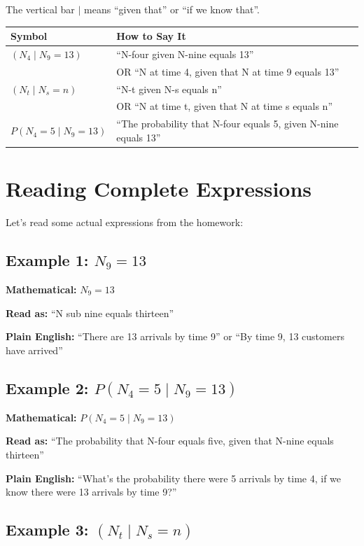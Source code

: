 \documentclass[11pt]{article}
\begin{document}
The vertical bar $|$ means ``given that'' or ``if we know that''.

\begin{table}[h]
\centering
\begin{tabular}{|l|l|}
\hline
\textbf{Symbol} & \textbf{How to Say It} \\
\hline
$(N_4 \mid N_9 = 13)$ & ``N-four given N-nine equals 13'' \\
 & OR ``N at time 4, given that N at time 9 equals 13'' \\
\hline
$(N_t \mid N_s = n)$ & ``N-t given N-s equals n'' \\
 & OR ``N at time t, given that N at time s equals n'' \\
\hline
$P(N_4 = 5 \mid N_9 = 13)$ & ``The probability that N-four equals 5, given N-nine equals 13'' \\
\hline
\end{tabular}
\end{table}

\section{Reading Complete Expressions}

Let's read some actual expressions from the homework:

\subsection{Example 1: $N_9 = 13$}

\textbf{Mathematical:} $N_9 = 13$

\textbf{Read as:} ``N sub nine equals thirteen''

\textbf{Plain English:} ``There are 13 arrivals by time 9'' or ``By time 9, 13 customers have arrived''

\subsection{Example 2: $P(N_4 = 5 \mid N_9 = 13)$}

\textbf{Mathematical:} $P(N_4 = 5 \mid N_9 = 13)$

\textbf{Read as:} ``The probability that N-four equals five, given that N-nine equals thirteen''

\textbf{Plain English:} ``What's the probability there were 5 arrivals by time 4, if we know there were 13 arrivals by time 9?''

\subsection{Example 3: $(N_t \mid N_s = n)$}
\end{document}
